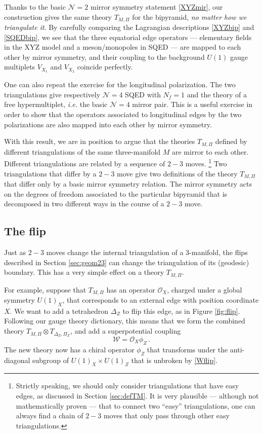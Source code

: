 \documentclass[hyper,letterpaper]{JHEP3}
\numberwithin{equation}{section}
\newcommand{\be}{\begin{equation}}
\newcommand{\ee}{\end{equation}}
\newcommand{\CN}{\mathcal{N}}
\newcommand{\CO}{\mathcal{O}}
\newcommand{\CW}{\mathcal{W}}
\begin{document}
Thanks to the basic $\CN=2$ mirror symmetry statement \eqref{XYZmir}, our construction gives the same theory
$T_{M,\Pi}$ for the bipyramid, \emph{no matter how we triangulate it}.
By carefully comparing the Lagrangian descriptions \eqref{XYZbip} and \eqref{SQEDbip}, we see that the three equatorial edge operators --- elementary fields in the XYZ model and a meson/monopoles in SQED --- are mapped to each other by mirror symmetry, and their coupling to the background $U(1)$ gauge multiplets $V_{X_1}$ and $V_{X_2}$ coincide perfectly.




One can also repeat the exercise for the longitudinal polarization. The two triangulations give respectively
$\CN=4$ SQED with $N_f=1$ and the theory of a free hypermultiplet, {\it i.e.} the basic $\CN=4$ mirror pair.
This is a useful exercise in order to show that the operators associated to
longitudinal edges by the two polarizations are also mapped into each other by mirror symmetry.

With this result, we are in position to argue that the theories $T_{M,\Pi} $
defined by different triangulations of the same three-manifold $M$ are mirror to each other.
Different triangulations are related by a sequence of $2-3$ moves.%
%
\footnote{Strictly speaking, we should only consider triangulations that have easy edges, as discussed in Section \ref{sec:defTM}. It is very plausible --- although not mathematically proven --- that to connect two ``easy'' triangulations, one can always find a chain of $2-3$ moves that only pass through other easy triangulations.} %
%
Two triangulations that differ by a $2-3$ move give two definitions of the theory $T_{M,\Pi}$
that differ only by a basic mirror symmetry relation. The mirror symmetry  acts on the degrees of freedom
associated to the particular bipyramid that is decomposed in two different ways in the course of a $2-3$ move.




\subsection{The flip}
\label{sec:flip}

Just as $2-3$ moves change the internal triangulation of a 3-manifold, the flips described in Section \ref{sec:geom23} can change the triangulation of its (geodesic) boundary. This has a very simple effect on a theory $T_{M,\Pi}$.

For example, suppose that $T_{M,\Pi}$ has an operator $\CO_X$, charged under a global symmetry $U(1)_X$, that corresponds to an external edge with position coordinate $X$. We want to add a tetrahedron $\Delta_Z$ to flip this edge, as in Figure \ref{fig:flip}. Following our gauge theory dictionary, this means that we form the combined theory $T_{M,\Pi}\otimes T_{\Delta_Z,\Pi_Z}$, and add a superpotential coupling
%
\be \CW = \CO_X\phi_Z\,. \label{Wflip} \ee
%
The new theory now has a chiral operator $\phi_Z$ that transforms under the anti-diagonal subgroup of $U(1)_X\times U(1)_Z$ that is unbroken by \eqref{Wflip}.
\end{document}

